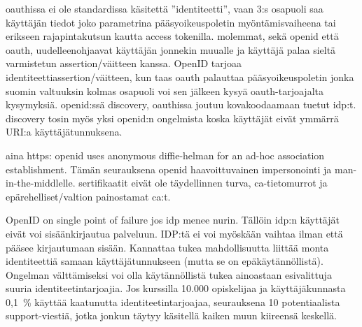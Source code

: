 \documentclass[finnish,gradu]{tktltiki}
\begin{document}
  oauthissa ei ole standardissa käsitettä ''identiteetti'', vaan 3:s osapuoli saa käyttäjän tiedot joko parametrina pääsyoikeuspoletin myöntämisvaiheena tai erikseen rajapintakutsun kautta access tokenilla.
  molemmat, sekä openid että oauth, uudelleenohjaavat käyttäjän jonnekin muualle ja käyttäjä palaa sieltä varmistetun assertion/väitteen kanssa. OpenID tarjoaa identiteettiassertion/väitteen, kun taas oauth palauttaa pääsyoikeuspoletin jonka suomin valtuuksin kolmas osapuoli voi sen jälkeen kysyä oauth-tarjoajalta kysymyksiä. openid:ssä discovery, oauthissa joutuu kovakoodaamaan tuetut idp:t. discovery tosin myös yksi openid:n ongelmista koska käyttäjät eivät ymmärrä URI:a käyttäjätunnuksena.


  aina https: openid uses anonymous diffie-helman for an ad-hoc association establishment. Tämän seurauksena openid haavoittuvainen impersonointi ja man-in-the-middlelle. sertifikaatit eivät ole täydellinnen turva, ca-tietomurrot ja epärehelliset/valtion painostamat ca:t.


  OpenID on single point of failure jos idp menee nurin. Tällöin idp:n käyttäjät eivät voi sisäänkirjautua palveluun. IDP:tä ei voi myöskään vaihtaa ilman että pääsee kirjautumaan sisään. Kannattaa tukea mahdollisuutta liittää monta identiteettiä samaan käyttäjätunnukseen (mutta se on epäkäytännöllistä). Ongelman välttämiseksi voi olla käytännöllistä tukea ainoastaan esivalittuja suuria identiteetintarjoajia. Jos kurssilla 10.000 opiskelijaa ja käyttäjäkunnasta 0,1~\% käyttää kaatunutta identiteetintarjoajaa, seurauksena 10 potentiaalista support-viestiä, jotka jonkun täytyy käsitellä kaiken muun kiireensä keskellä.

\end{document}
